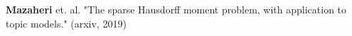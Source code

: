 \documentclass[preview]{standalone}
\begin{document}
\begin{center}
\textbf{Mazaheri} et. al. "The sparse Hausdorff moment problem, with application to topic models." (arxiv, 2019)
\end{center}
\end{document}
